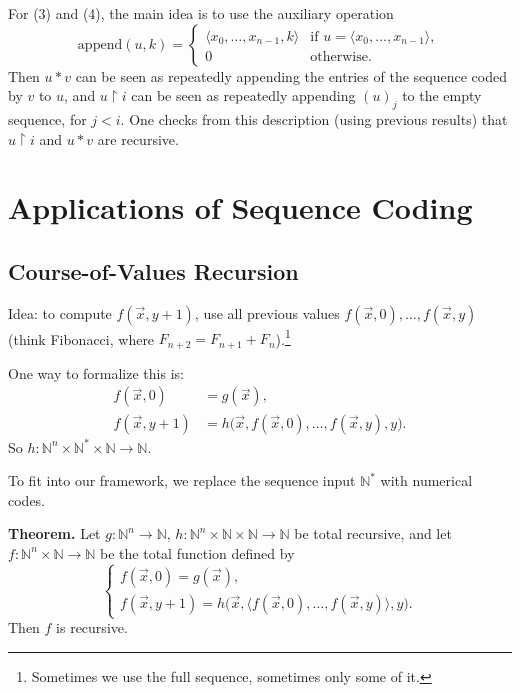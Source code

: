 \documentclass[11pt]{article}
\begin{document}
For (3) and (4), the main idea is to use the auxiliary operation
\[
    \mathrm{append}(u,k) = \begin{cases}
        \langle x_0, \dots, x_{n-1}, k\rangle & \text{if } u = \langle x_0, \dots, x_{n-1}\rangle, \\
        0 & \text{otherwise.}
    \end{cases}
\]
Then $u * v$ can be seen as repeatedly appending the entries of the sequence coded by $v$ to $u$, and $u \upharpoonright i$ can be seen as repeatedly appending $(u)_j$ to the empty sequence, for $j < i$. One checks from this description (using previous results) that $u \upharpoonright i$ and $u * v$ are recursive.

\section{Applications of Sequence Coding}

\subsection{Course-of-Values Recursion}

Idea: to compute $f(\vec{x}, y+1)$, use all previous values $f(\vec{x}, 0), \dots, f(\vec{x}, y)$ (think Fibonacci, where $F_{n+2} = F_{n+1} + F_n$).\footnote{Sometimes we use the full sequence, sometimes only some of it.}

One way to formalize this is:
\begin{align*}
    f(\vec{x}, 0) &= g(\vec{x}), \\
    f(\vec{x}, y+1) &= h\bigl(\vec{x}, f(\vec{x}, 0), \dots, f(\vec{x}, y), y\bigr).
\end{align*}
So $h\colon \mathbb{N}^n \times \mathbb{N}^* \times \mathbb{N} \to \mathbb{N}$.

To fit into our framework, we replace the sequence input $\mathbb{N}^*$ with numerical codes.

\textbf{Theorem.} Let $g\colon \mathbb{N}^n \to \mathbb{N}$, $h\colon \mathbb{N}^n \times \mathbb{N} \times \mathbb{N} \to \mathbb{N}$ be total recursive, and let $f\colon \mathbb{N}^n \times \mathbb{N} \to \mathbb{N}$ be the total function defined by
\[
    \begin{cases}
        f(\vec{x}, 0) = g(\vec{x}), \\
        f(\vec{x}, y+1) = h\bigl(\vec{x}, \langle f(\vec{x}, 0), \dots, f(\vec{x}, y)\rangle, y\bigr).
    \end{cases}
\]
Then $f$ is recursive.
\end{document}
